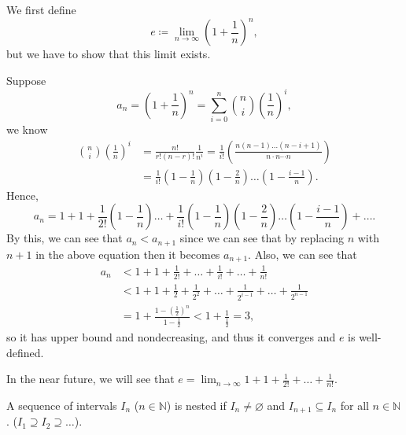 \begin{eg}
    We first define 
    \[
        e \coloneqq \lim_{n \to \infty} \left( 1+ \frac{1}{n} \right)^n ,
    \]
    but we have to show that this limit exists.
\end{eg}
\begin{explanation}
     Suppose
    \[
        a_n = \left( 1 + \frac{1}{n} \right)^n = \sum_{i = 0}^n \binom{n}{i}\left( \frac{1}{n} \right)^i,
    \]
    we know 
    \begin{align*}
                \binom{n}{i}\left( \frac{1}{n} \right)^i &= \frac{n!}{r! (n-r)!} \frac{1}{n^i} = \frac{1}{i!} \left( \frac{n(n-1)\dots (n-i+1)}{n \cdot n \cdots n} \right) \\ 
                &= \frac{1}{i!}\left( 1 - \frac{1}{n} \right) \left( 1 - \frac{2}{n} \right) \dots  \left( 1 - \frac{i-1}{n} \right).  
    \end{align*}
    Hence, 
    \[
        a_n = 1 + 1 + \frac{1}{2!} \left( 1 - \frac{1}{n} \right) \dots + \frac{1}{i!}\left( 1 - \frac{1}{n} \right) \left( 1 - \frac{2}{n} \right) \dots  \left( 1 - \frac{i-1}{n} \right) +\dots.  
    \]
    By this, we can see that \(a_n < a_{n+1} \) since we can see that by replacing \(n\) with \(n+1\) in the above equation then it becomes \(a_{n+1} \).    
    Also, we can see that 
   \begin{align*}
            a_n &< 1 + 1 + \frac{1}{2!} + \dots + \frac{1}{i!} + \dots + \frac{1}{n!} \\
            &< 1 + 1 + \frac{1}{2} + \frac{1}{2^2} + \dots + \frac{1}{2^{i-1} } + \dots + \frac{1}{2^{n-1}} \\
            &= 1 + \frac{1 - \left( \frac{1}{2} \right)^n }{1 - \frac{1}{2} } < 1 + \frac{1}{\frac{1}{2}} = 3,
   \end{align*} 
   so it has upper bound and nondecreasing, and thus it converges and \(e\) is well-defined. 
   \begin{note}
    In the near future, we will see that \(e = \lim_{n \to \infty} 1 + 1 + \frac{1}{2!} + \dots + \frac{1}{n!}\). 
\end{note}
\end{explanation}

\begin{definition}
    A sequence of intervals \(I_n\) (\(n \in \mathbb{N} \)) is nested if \(I_n \neq \varnothing \) and \(I_{n+1} \subseteq I_n\) for all \(n \in \mathbb{N}\). (\(I_1 \supseteq I_2 \supseteq \dots\)).     
\end{definition}

